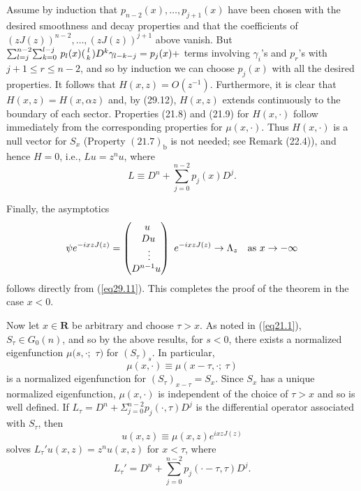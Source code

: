 \documentclass{surv-l}
\theoremstyle{plain}
\theoremstyle{definition}
\numberwithin{equation}{chapter}
\begin{document}
Assume by induction that $p_{n-2}(x),\ldots,p_{j+1}(x)$ have been chosen with the desired smoothness and decay properties and that the coefficients of $(zJ(z))^{n-2},\ldots,(zJ(z))^{j+1}$ above vanish. But $ {\sum}_{l=j}^{n-2}{\sum}_{k=0}^{l-j}\ p_{l}(x)({l \atop k}) D^{k}\gamma_{l-k-j}=p_{j}(x)+$ terms involving $\gamma_{i}$'s and $p_{r}$'s with $j+1\leq r\leq n-2$, and so by induction we can choose $p_{j}(x)$ with all the desired properties. It follows that $H(x, z)=O(z^{-1})$. Furthermore, it is clear that $H(x, z)=H(x, \alpha z)$ and, by (29.12), $H(x, z)$ extends continuously to the boundary of each sector. Properties (21.8) and (21.9) for $H(x, \cdot)$ follow immediately from the corresponding properties for $\mu(x, \cdot)$. Thus $H(x, \cdot)$ is a null vector for $S_{x}$ (Property $(21.7)_{\mathrm{b}}$ is not needed; see Remark (22.4)), and hence $H=0$, i.e., $Lu=z^{n}u$, where
\begin{equation*}
L\equiv D^{n}+\sum_{j=0}^{n-2}p_{j}(x)D^{j}.
\end{equation*}

Finally, the asymptotics
\begin{equation}\label{eq30.6}
\psi e^{-ixzJ(z)}=\left(\begin{array}{@{}l@{}}
\ \ \ \ u\\
\ \ \ Du\\
{\ \ \ \ \   \vdots}\\
D^{n-1}u
\end{array}\right)\ e^{-ixzJ(z)}\rightarrow\Lambda_{z}\quad \mathrm{as}\  x\rightarrow-\infty
\end{equation}
follows directly from (\ref{eq29.11}). This completes the proof of the theorem in the case $x<0$.

Now let $x\in \mathbf{R}$ be arbitrary and choose $\tau>x$. As noted in (\ref{eq21.1}), $S_{\tau}\in G_{0}(n)$, and so by the above results, for $s<0$, there exists a normalized eigenfunction $\mu(s, \cdot$;\ $\tau)$ for $(S_{\tau})_{s}$. In particular,
\begin{equation}\label{eq30.7}
\mu(x, \cdot)\equiv\mu(x-\tau, \cdot\mathrm{;}\ \tau)
\end{equation}
is a normalized eigenfunction for $(S_{\tau})_{x-\tau}=S_{x}$. Since $S_{x}$ has a unique normalized eigenfunction, $\mu(x, \cdot)$ is independent of the choice of $\tau >x$ and so is well defined. If $L_{\tau}=D^{n}+\displaystyle {\Sigma}_{j=0}^{n-2}p_{j}(\cdot, \tau)D^{j}$ is the differential operator associated with $S_{\tau}$, then
\begin{equation}\label{eq30.8}
u(x, z)\equiv\mu(x, z)e^{ixzJ(z)}
\end{equation}
solves $L_{\tau}'u(x, z)=z^{n}u(x, z)$ for $ x<\tau$, where
\begin{equation}\label{eq30.9}
L_{\tau}'=D^{n}+\sum_{j=0}^{n-2}p_{j} (\cdot -\tau,\tau)D^{j}.
\end{equation}
\end{document}
